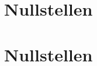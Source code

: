\documentclass
[
  draft    = true,
  fontsize = 11pt,
  parskip  = half-,
  BCOR     = 0pt,
  DIV      = 11,
  ngerman
]
{scrreprt}
\begin{document}

\newsavebox{\dummy}%
%
%

\newcommand{\subdir}{}

\section*{Nullstellen}

\clearpage
\setcounter{excounter}{0}
\section*{Nullstellen}

\end{document}
